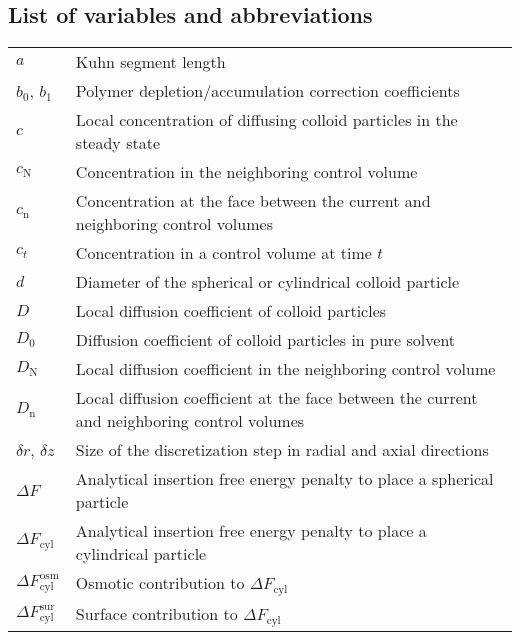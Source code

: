\documentclass[10pt, a4paper]{article}
\begin{document}

\pagebreak
\subsection*{List of variables and abbreviations}

\begin{tabularx}{\linewidth}{l X}
    $a$ & Kuhn segment length \\
    $b_0$, $b_1$ & Polymer depletion/accumulation correction coefficients \\
    $c$ & Local concentration of diffusing colloid particles in the steady state \\
    $c_{\text{N}}$ & Concentration in the neighboring control volume \\
    $c_{\text{n}}$ & Concentration at the face between the current and neighboring control volumes \\
    $c_{t}$ & Concentration in a control volume at time $t$ \\
    $d$ & Diameter of the spherical or cylindrical colloid particle \\
    $D$ & Local diffusion coefficient of colloid particles \\
    $D_0$ & Diffusion coefficient of colloid particles in pure solvent \\
    $D_{\text{N}}$ & Local diffusion coefficient in the neighboring control volume \\
    $D_{\text{n}}$ & Local diffusion coefficient at the face between the current and neighboring control volumes \\
    $\delta r$, $\delta z$ & Size of the discretization step in radial and axial directions \\
    $\Delta F$ & Analytical insertion free energy penalty to place a spherical particle \\
    $\Delta F_{\text{cyl}}$ & Analytical insertion free energy penalty to place a cylindrical particle \\
    $\Delta F_{\text{cyl}}^{\text{osm}}$ & Osmotic contribution to $\Delta F_{\text{cyl}}$ \\
    $\Delta F_{\text{cyl}}^{\text{sur}}$ & Surface contribution to $\Delta F_{\text{cyl}}$ \\

\end{tabularx}
\end{document}
